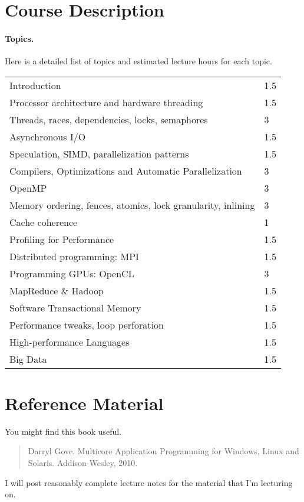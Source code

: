 \documentclass{article}
\begin{document}
\section*{Course Description}

\paragraph{Topics.} Here is a detailed list of topics and estimated lecture
hours for each topic. 

\begin{tabular}{ll}
Introduction & 1.5 \\
Processor architecture and hardware threading & 1.5 \\
Threads, races, dependencies, locks, semaphores & 3 \\
Asynchronous I/O & 1.5 \\
Speculation, SIMD, parallelization patterns & 1.5 \\
Compilers, Optimizations and Automatic Parallelization & 3 \\
OpenMP & 3 \\
Memory ordering, fences, atomics, lock granularity, inlining & 3 \\
Cache coherence & 1 \\
Profiling for Performance & 1.5 \\
Distributed programming: MPI & 1.5\\
Programming GPUs: OpenCL & 3 \\
MapReduce \& Hadoop & 1.5 \\
Software Transactional Memory & 1.5 \\
Performance tweaks, loop perforation & 1.5 \\
High-performance Languages & 1.5 \\
Big Data & 1.5 
\end{tabular}

\section*{Reference Material}
You might find this book useful.

\begin{quote}
    Darryl Gove. Multicore Application Programming for Windows, Linux and Solaris. Addison-Wesley, 2010.
\end{quote}

\noindent
I will post reasonably complete lecture notes for the material
that I'm lecturing on.
\end{document}
